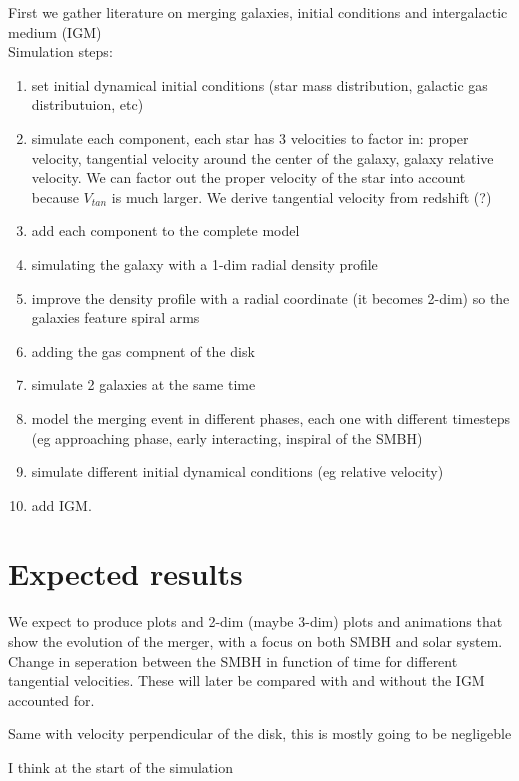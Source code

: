 \documentclass[11pt, english]{article}
\begin{document}
First we gather literature on merging galaxies, initial conditions and intergalactic medium (IGM)\\
Simulation steps:\\
\begin{enumerate}
 
\item set initial dynamical initial conditions (star mass distribution, galactic gas distributuion, etc)
\item  simulate each component, each star has 3 velocities to factor in: proper velocity, tangential velocity around the center of the galaxy, galaxy relative velocity. We can factor out the proper velocity of the star into account because \(V_{tan}\) is much larger. We derive tangential velocity from redshift (?)
\item  add each component to the complete model
\item  simulating the galaxy with a 1-dim radial density profile
\item  improve the density profile with a radial coordinate (it becomes 2-dim) so the galaxies feature spiral arms
\item  adding the gas compnent of the disk
\item  simulate 2 galaxies at the same time
\item  model the merging event in different phases, each one with different timesteps (eg approaching phase, early interacting, inspiral of the SMBH)
\item  simulate different initial dynamical conditions (eg relative velocity)
\item  add IGM.

\end{enumerate}
\section{Expected results}

We expect to produce plots and 2-dim (maybe 3-dim) plots and animations that show the evolution of the merger, with a focus on both SMBH and solar system.
Change in seperation between the SMBH in function of time for different tangential velocities. These will later be compared with and without the IGM accounted for.



Same with velocity perpendicular of the disk, this is mostly going to be negligeble

I think at the start of the simulation
\end{document}
